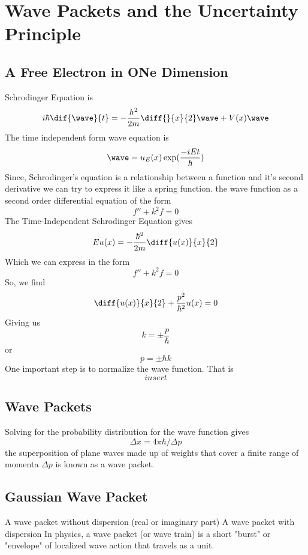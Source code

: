 \chapter{Wave Packets and the Uncertainty Principle}
\section{A Free Electron in ONe Dimension}
Schrodinger Equation is
\[ i\hbar \dif{\wave}{t} = -\frac{h^2}{2m} \diff{}{x}{2} \wave + V(x)\wave\]
The time independent form wave equation is 
\[ \wave = u_E(x) \exp(\frac{-iEt}{\hbar}) \]
Since, Schrodinger's equation is a relationship between a function and it's second derivative we can try to express it like a spring function. the wave function as a second order differential equation of the form 
\[ f'' + k^2f = 0 \]
The Time-Independent Schrodinger Equation gives 
\[ Eu(x) = -\frac{\hbar^2}{2m} \diff{u(x)}{x}{2}\]
Which we can express in the form
\[ f'' + k^2 f = 0 \]
So, we find
\[ \diff{u(x)}{x}{2} + \frac{p^2}{\hbar^2} u(x) = 0  \]
Giving us
\[ k = \pm \frac{p}{\hbar} \]
or 
\[ p = \pm \hbar k \]
One important step is to normalize the wave function. That is 
\[ insert \]
\section{Wave Packets}
Solving for the probability distribution for the wave function gives 
\[ \Delta x = 4 \pi \hbar / \Delta p \]
the superposition of plane waves made up of weights that cover a finite range of momenta $ \Delta p $ is known as a wave packet. 
\section{Gaussian Wave Packet}
A wave packet without dispersion (real or imaginary part)
A wave packet with dispersion
In physics, a wave packet (or wave train) is a short "burst" or "envelope" of localized wave action that travels as a unit. 
